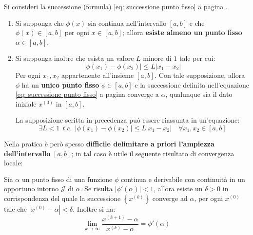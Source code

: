 \begin{definitionbox}
    Si consideri la successione (formula) \ref{eq: successione punto fisso} a pagina \pageref{eq: successione punto fisso}.
    \begin{enumerate}
        \item Si supponga che $\phi\left(x\right)$ sia continua nell'intervallo $\left[a,b\right]$ e che $\phi\left(x\right) \in \left[a,b\right]$ per ogni $x \in \left[a,b\right]$; allora \textbf{esiste almeno un punto fisso} $\alpha \in \left[a,b\right]$.

        \item Si supponga inoltre che esista un valore $L$ minore di $1$ tale per cui:
        \begin{equation*}
            \left|\phi\left(x_{1}\right)-\phi\left(x_{2}\right)\right| \le L \left|x_{1}-x_{2}\right|
        \end{equation*}
        Per ogni $x_{1},x_{2}$ appartenente all'insieme $\left[a,b\right]$. Con tale supposizione, allora $\phi$ ha un \textbf{unico punto fisso} $\phi\in\left[a,b\right]$ e la successione definita nell'equazione \ref{eq: successione punto fisso} a pagina \pageref{eq: successione punto fisso} converge a $\alpha$, qualunque sia il dato iniziale $x^{\left(0\right)}$ in $\left[a,b\right]$.

        La supposizione scritta in precedenza può essere riassunta in un'equazione:
        \begin{equation}
            \exists L < 1 \:\: t.c. \:\: \left| \phi\left(x_{1}\right)-\phi\left(x_{2}\right)\right| \le L \left|x_{1}-x_{2}\right| \hspace{1em} \forall x_{1},x_{2} \in \left[a,b\right]
        \end{equation}
    \end{enumerate}
\end{definitionbox}

\noindent
Nella pratica è però spesso \textbf{difficile delimitare a priori l'ampiezza dell'intervallo} $\left[a,b\right]$; in tal caso è utile il seguente risultato di convergenza locale:
\begin{theorem}[di Ostrowski]\label{theorem: teorema di Ostrowski}
    Sia $\alpha$ un punto fisso di una funzione $\phi$ continua e derivabile con continuità in un opportuno intorno $\mathcal{J}$ di $\alpha$. Se risulta $\left|\phi'\left(\alpha\right)\right| < 1$, allora esiste un $\delta > 0$ in corrispondenza del quale la successione $\left\{x^{\left(k\right)}\right\}$ converge ad $\alpha$, per ogni $x^{\left(0\right)}$ tale che $\left|x^{\left(0\right)} - \alpha \right| < \delta$. Inoltre si ha:
    \begin{equation}
        \displaystyle\lim_{k \rightarrow \infty} \dfrac{
            x^{\left(k+1\right)} - \alpha
        }{
            x^{\left(k\right)}-\alpha
        } = \phi'\left(\alpha\right)
    \end{equation}
\end{theorem}

